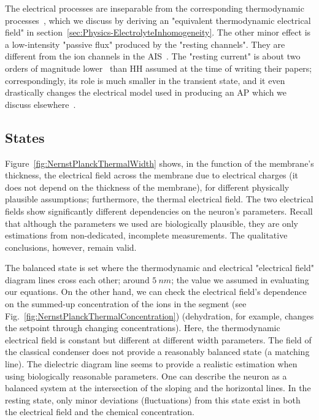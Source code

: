 The electrical processes are inseparable from the corresponding thermodynamic processes~\cite{VeghNonOrdinaryLawsForLife:2025}, which we discuss by deriving an "equivalent thermodynamic electrical field" in section~\ref{sec:Physics-ElectrolyteInhomogeneity}.
The other minor effect is a low-intensity "passive flux" produced by the
"resting channels". They are different from the ion channels in the \gls{AIS}~\cite{AIS_NeuronalPolarity:2010, ActionPotentialGenerationNatrium:2008, BackpropagationAP:2012, AIS_Updated_Viewpoint:2018, AISStructureReview:2018}.
The "resting current" is about two orders of magnitude lower~\cite{EnergyNeuralCommunication:2021,NeuralEnergyConsumption:2017} than \gls{HH} assumed at the time of writing their papers; correspondingly, its role is much smaller in the transient state, and it even drastically changes the electrical model used in producing an \gls{AP} which we discuss elsewhere~\cite{VeghDANCES:2026}.
\else

\fi


\ifx\magyar\undefined
\subsection{States\label{sec:PHYSICS_STATES}}

Figure~\ref{fig:NernstPlanckThermalWidth} shows, in the function of the membrane's thickness, the electrical field across the membrane due to electrical charges (it does not depend on the thickness of the membrane), for different physically plausible assumptions; furthermore, the thermal electrical field. The two electrical fields show significantly different dependencies on the neuron's parameters. Recall that although the parameters we used are biologically plausible, they are only estimations from non-dedicated, incomplete measurements. The qualitative conclusions, however, remain valid. 

The balanced state is set where the thermodynamic and electrical "electrical field" diagram lines cross each other; 
around $5\ nm$; the value we assumed in evaluating our equations.  
On the other hand, we can check the electrical field's dependence on the summed-up concentration of the ions in the segment (see Fig.~\ref{fig:NernstPlanckThermalConcentration})
(dehydration, for example, changes the setpoint through changing concentrations).
Here, the thermodynamic electrical field is constant but different at different width parameters. The field of the classical condenser does not provide a reasonably balanced state (a matching line). The dielectric diagram line seems to provide a realistic estimation 
when using biologically reasonable parameters. 
One can describe the neuron as a balanced system at the intersection of the sloping and the horizontal lines. In the resting state, only minor deviations (fluctuations) from this state exist
in both the electrical field and the chemical concentration. 
\else

